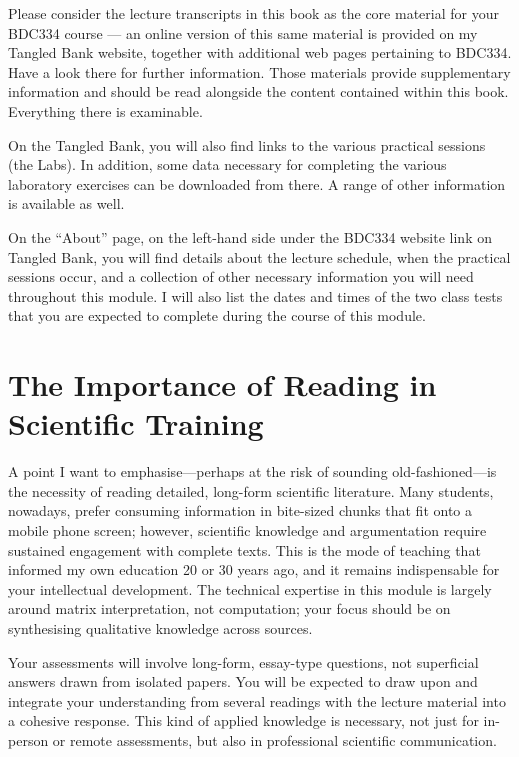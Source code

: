 \documentclass[
  11pt,
]{book}
\begin{document}
Please consider the lecture transcripts in this book as the core
material for your BDC334 course --- an online version of this same
material is provided on my Tangled Bank website, together with
additional web pages pertaining to BDC334. Have a look there for further
information. Those materials provide supplementary information and
should be read alongside the content contained within this book.
Everything there is examinable.

On the Tangled Bank, you will also find links to the various practical
sessions (the Labs). In addition, some data necessary for completing the
various laboratory exercises can be downloaded from there. A range of
other information is available as well.

On the ``About'' page, on the left-hand side under the BDC334 website
link on Tangled Bank, you will find details about the lecture schedule,
when the practical sessions occur, and a collection of other necessary
information you will need throughout this module. I will also list the
dates and times of the two class tests that you are expected to complete
during the course of this module.

\section{The Importance of Reading in Scientific
Training}\label{the-importance-of-reading-in-scientific-training}

A point I want to emphasise---perhaps at the risk of sounding
old-fashioned---is the necessity of reading detailed, long-form
scientific literature. Many students, nowadays, prefer consuming
information in bite-sized chunks that fit onto a mobile phone screen;
however, scientific knowledge and argumentation require sustained
engagement with complete texts. This is the mode of teaching that
informed my own education 20 or 30 years ago, and it remains
indispensable for your intellectual development. The technical expertise
in this module is largely around matrix interpretation, not computation;
your focus should be on synthesising qualitative knowledge across
sources.

Your assessments will involve long-form, essay-type questions, not
superficial answers drawn from isolated papers. You will be expected to
draw upon and integrate your understanding from several readings with
the lecture material into a cohesive response. This kind of applied
knowledge is necessary, not just for in-person or remote assessments,
but also in professional scientific communication.
\end{document}
